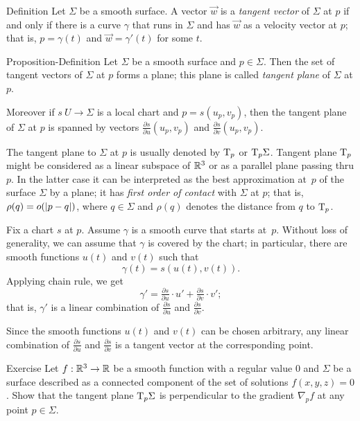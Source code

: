 \begin{thm}{Definition}\label{def:tangent-vector}
Let $\Sigma$ be a smooth surface.
A vector $\vec w$ is a \emph{tangent vector} of $\Sigma$ at $p$ if and only if there is a curve $\gamma$ that runs in $\Sigma$ and has $\vec w$ as a velocity vector at $p$;
that is, $p=\gamma(t)$ and $\vec w=\gamma'(t)$ for some $t$.
\end{thm}

\begin{thm}{Proposition-Definition}\label{def:tangent-plane}
Let $\Sigma$ be a smooth surface and $p\in \Sigma$.
Then the set of tangent vectors of $\Sigma$ at $p$ forms a plane;
this plane is called \emph{tangent plane} of $\Sigma$ at $p$.

Moreover if $s\:U\to \Sigma$ is a local chart and $p=s(u_p,v_p)$, then 
the tangent plane of $\Sigma$ at $p$ is spanned by vectors $\tfrac{\partial s}{\partial u}(u_p,v_p)$ and $\tfrac{\partial s}{\partial v}(u_p,v_p)$.
\end{thm}

The tangent plane to $\Sigma$ at $p$ is usually denoted by $\mathrm{T}_p$ or $\mathrm{T}_p\Sigma$.
Tangent plane $\mathrm{T}_p$ might be considered as a linear subspace of $\mathbb{R}^3$ or as a parallel plane passing thru $p$.
In the latter case it can be interpreted as the best approximation at~$p$ of the surface $\Sigma$ by a plane;
it has \emph{first order of contact} with $\Sigma$ at $p$;
that is, $\rho(q)\z=o(|p-q|)$, where $q\in \Sigma$ and $\rho(q)$ denotes the distance from $q$ to $\mathrm{T}_p$.

Fix a chart $s$ at $p$.
Assume $\gamma$ is a smooth curve that starts at~$p$.
Without loss of generality, we can assume that $\gamma$ is covered by the chart;
in particular, there are smooth functions $u(t)$ and $v(t)$ such that 
\[\gamma(t)=s(u(t),v(t)).\]
Applying chain rule, we get
\[\gamma'=\tfrac{\partial s}{\partial u}\cdot u'+ \tfrac{\partial s}{\partial v}\cdot v';\]
that is, $\gamma'$ is a linear combination of $\tfrac{\partial s}{\partial u}$ and $\tfrac{\partial s}{\partial v}$.

Since the smooth functions $u(t)$ and $v(t)$ can be chosen arbitrary, any linear combination of $\tfrac{\partial s}{\partial u}$ and $\tfrac{\partial s}{\partial v}$ is a tangent vector at the corresponding point. 
\qeds


\begin{thm}{Exercise}\label{ex:tangent-normal}
Let $f:\mathbb{R}^3\to\mathbb{R}$ be a smooth function with a regular value $0$ and $\Sigma$ be a surface described as a connected component of the set of solutions $f(x,y,z)=0$.
Show that the tangent plane $\mathrm{T}_p\Sigma$ is perpendicular to the gradient $\nabla_pf$ at any point $p\in\Sigma$.
\end{thm}

